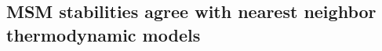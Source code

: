 \documentclass[journal=jpcbfk,manuscript=article]{achemso}
\begin{document}

\subsection{MSM stabilities agree with nearest neighbor thermodynamic models}

\end{document}
